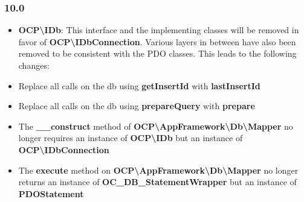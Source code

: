\documentclass[letterpaper,10pt,english]{sphinxmanual}
\begin{document}
\subsubsection{10.0}
\label{app/changelog:id2}\begin{itemize}
\item {} 
\textbf{OCP\textbackslash{}IDb}: This interface and the implementing classes will be removed in favor of \textbf{OCP\textbackslash{}IDbConnection}. Various layers in between have also been removed to be consistent with the PDO classes. This leads to the following changes:

\end{itemize}
\begin{itemize}
\item {} 
Replace all calls on the db using \textbf{getInsertId} with \textbf{lastInsertId}

\item {} 
Replace all calls on the db using \textbf{prepareQuery} with \textbf{prepare}

\item {} 
The \textbf{\_\_construct} method of \textbf{OCP\textbackslash{}AppFramework\textbackslash{}Db\textbackslash{}Mapper} no longer requires an instance of \textbf{OCP\textbackslash{}IDb} but an instance of \textbf{OCP\textbackslash{}IDbConnection}

\item {} 
The \textbf{execute} method on \textbf{OCP\textbackslash{}AppFramework\textbackslash{}Db\textbackslash{}Mapper} no longer returns an instance of \textbf{OC\_DB\_StatementWrapper} but an instance of \textbf{PDOStatement}

\end{itemize}
\end{document}
